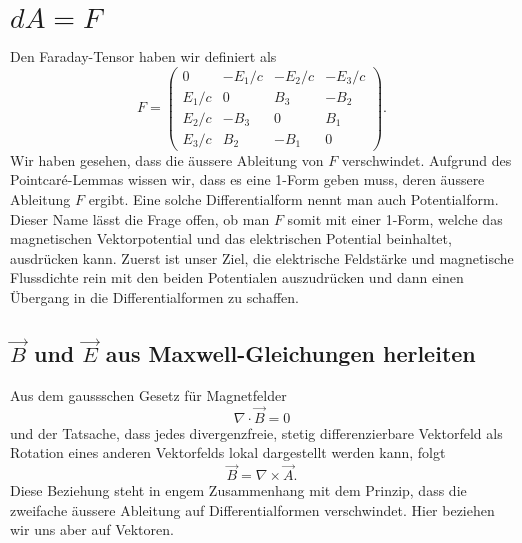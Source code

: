 \section{$dA = F$
	\label{maxwell:section:dA}}
Den Faraday-Tensor haben wir definiert als
\begin{equation}
	F = \begin{pmatrix}
		0 & -E_1/c & -E_2/c & -E_3/c \\ E_1/c & 0 & B_3 & -B_2 \\ E_2/c & -B_3 & 0 & B_1 \\ E_3/c & B_2 & -B_1 & 0 
	\end{pmatrix}.
	\label{maxwell:section:dA:Faraday-Tensor}
\end{equation}
Wir haben gesehen, dass die äussere Ableitung von $F$ verschwindet.
Aufgrund des Pointcaré-Lemmas wissen wir, dass es eine 1-Form geben muss, deren äussere Ableitung $F$ ergibt.
Eine solche Differentialform nennt man auch Potentialform.
Dieser Name lässt die Frage offen, ob man $F$ somit mit einer 1-Form, welche das magnetischen Vektorpotential und das elektrischen Potential beinhaltet, ausdrücken kann.
Zuerst ist unser Ziel, die elektrische Feldstärke und magnetische Flussdichte rein mit den beiden Potentialen auszudrücken und dann einen Übergang in die Differentialformen zu schaffen. 

\subsection{$\vec{B}$ und $\vec{E}$ aus Maxwell-Gleichungen herleiten}
Aus dem gaussschen Gesetz für Magnetfelder
\begin{equation*}
	\nabla \cdot \vec{B} = 0
\end{equation*}
und der Tatsache, dass jedes divergenzfreie, stetig differenzierbare Vektorfeld als Rotation eines anderen Vektorfelds lokal dargestellt werden kann,
folgt
\begin{equation}
	\label{maxwell:dA;rotA}
	\vec{B} = \nabla \times \vec{A}.
\end{equation}
Diese Beziehung steht in engem Zusammenhang mit dem Prinzip, dass die zweifache äussere Ableitung auf Differentialformen verschwindet. Hier beziehen wir uns aber auf Vektoren.

